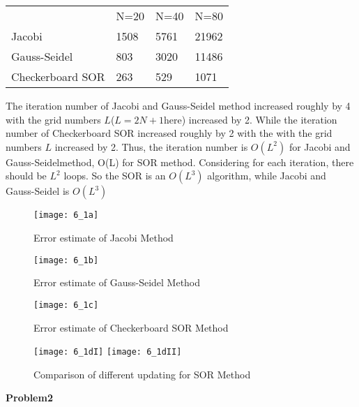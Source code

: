 \documentclass{article}
\begin{document}
\begin{tabular}{llll}
               & N=20 & N=40 & N=80\\
Jacobi & 1508  &  5761   & 21962\\
Gauss-Seidel & 803 & 3020   &11486\\
Checkerboard SOR &263 & 529  & 1071
\end{tabular}
\vskip0.2cm
The iteration number of Jacobi and Gauss-Seidel method increased roughly by 4 with the grid numbers $L$($L=2N+1$here) increased by 2.  While the iteration number of Checkerboard SOR increased roughly by 2 with the with the grid numbers $L$ increased by 2.  Thus, the iteration number is $O(L^2)$ for Jacobi and Gauss-Seidelmethod, O(L) for SOR method.  Considering for each iteration, there should be $L^2$ loops.   So the SOR is an $O(L^3)$ algorithm, while Jacobi and Gauss-Seidel is $O(L^3)$

\begin{figure} [ht]
\texttt{[image: 6\_1a]}
\caption{Error estimate of Jacobi Method}
\end{figure}
\newpage
\begin{figure} [ht]
\texttt{[image: 6\_1b]}
\caption{Error estimate of Gauss-Seidel Method}
\end{figure}

\begin{figure} [ht]
\texttt{[image: 6\_1c]}
\caption{Error estimate of Checkerboard SOR Method}
\end{figure}

\begin{figure} [ht]
\texttt{[image: 6\_1dI]}
\texttt{[image: 6\_1dII]}
\caption{Comparison of different updating for SOR Method}
\end{figure}

\newpage
\textbf{Problem2}
\end{document}
